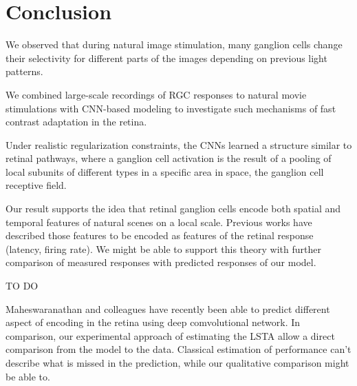 \section{Conclusion}\label{sec:Conclusion}

We observed that during natural image stimulation, many ganglion cells change
their selectivity for different parts of the images depending on previous light
patterns.

We combined large-scale recordings of RGC responses to natural movie
stimulations with CNN-based modeling to investigate such mechanisms of fast
contrast adaptation in the retina.

Under realistic regularization constraints, the CNNs learned a structure
similar to retinal pathways, where a ganglion cell activation is the result of
a pooling of local subunits of different types in a specific area in space, the
ganglion cell receptive field.

Our result supports the idea that retinal ganglion cells encode both
spatial and temporal features of natural scenes on a local scale.
Previous works have described those features to be encoded as features of the
retinal response (latency, firing rate). We might be able to support this
theory with further comparison of measured responses with predicted responses of
our model.


TO DO



Maheswaranathan and colleagues \citep{maheswaranathan_interpreting_2023} have recently
been able to predict different aspect of encoding in the retina using deep
comvolutional network. In comparison, our experimental approach of estimating
the LSTA allow a direct comparison from the model to the data. Classical
estimation of performance can't describe what is missed in the prediction,
while our qualitative comparison might be able to.

